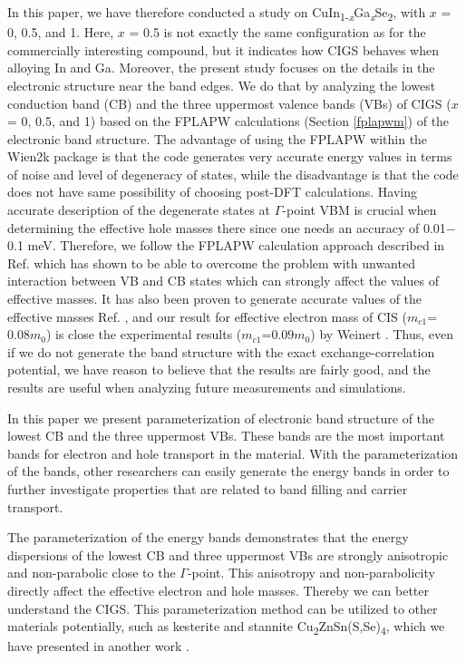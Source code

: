 \documentclass[a4paper, 12pt, titlepage,oneside,drop]{kthesis}
\begin{document}
In this paper, we have therefore conducted a study on CuIn\textsubscript{1-\textit{x}}Ga\textsubscript{\textit{x}}Se\textsubscript{2}, with $x$ = 0, 0.5, and 1. Here, $x$ = 0.5 is not exactly the same configuration as for the
commercially interesting compound, but it indicates how CIGS behaves when alloying In and Ga. Moreover, the present study focuses on the details in the electronic structure near the band edges. We do that by analyzing
the lowest conduction band (CB) and the three uppermost valence bands (VBs) of CIGS ($x$ = 0, 0.5, and 1) based on the FPLAPW calculations (Section \ref{fplapwm}) of the electronic band structure. The advantage of using the FPLAPW within the 
Wien2k package is that the code generates very accurate energy values in terms of noise and level of degeneracy of states, while the disadvantage is that the code does not have same possibility of choosing post-DFT calculations.
Having accurate description of the degenerate states at $\Gamma$-point VBM is crucial when determining the effective hole masses there since one needs an accuracy of 0.01$-$0.1 meV. Therefore, we follow the FPLAPW calculation approach
described in Ref. \cite{persson2008anisotropic} which has shown to be able to overcome the problem with unwanted interaction between VB and CB states which can strongly affect the values of effective masses. It has also been proven
to generate accurate values of the effective masses Ref. \cite{persson1997relativistic}, and our result for effective electron mass of CIS ($m_{c1}$=$0.08m_0$) is close the experimental results ($m_{c1}$=$0.09m_0$)
by Weinert \cite{neumann1978electrical}. Thus, even if we do not generate the band structure with the exact exchange-correlation potential, we have reason to believe that the results are fairly good, and the results are useful when 
analyzing future measurements and simulations.

In this paper we present parameterization of electronic band structure of the lowest CB and the three uppermost VBs. These bands are the most important bands for electron and hole transport in the material. With the parameterization
of the bands, other researchers can easily generate the energy bands in order to further investigate properties that are related to band filling and carrier transport. 

The parameterization of the energy bands demonstrates that the energy dispersions of the lowest CB and three uppermost VBs are strongly anisotropic and non-parabolic close to the $\Gamma$-point. This anisotropy and non-parabolicity 
directly affect the effective electron and hole masses. Thereby we can better understand the CIGS. This parameterization method can be utilized to other materials potentially, such as kesterite and stannite 
Cu\textsubscript{2}ZnSn(S,Se)\textsubscript{4}, which we have presented in another work \cite{X}.
\end{document}
